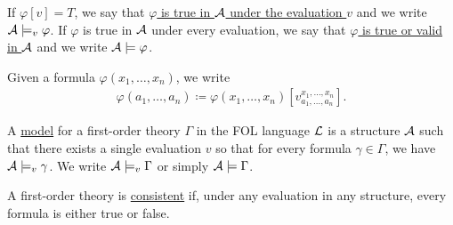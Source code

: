 \begin{definition}
  If $\varphi[v] = T$, we say that \ul{$\varphi$ is true in $\mathcal A$ under the evaluation $v$} and we write $\mathcal A \models_v \varphi$. If $\varphi$ is true in $\mathcal A$ under every evaluation, we say that \ul{$\varphi$ is true or valid in $\mathcal A$} and we write $\mathcal A \models \varphi$.

  Given a formula $\varphi(x_1, \ldots, x_n)$, we write
  \begin{align*}
    \varphi(a_1, \ldots, a_n) \coloneqq \varphi(x_1, \ldots, x_n)[v_{a_1, \ldots, a_n}^{x_1, \ldots, x_n}].
  \end{align*}
\end{definition}

\begin{definition}\label{def:first_order_model}\cite[definition 4.4]{Nerode2012}
  A \ul{model} for a first-order theory $\Gamma$ in the FOL language $\mathcal L$ is a structure $\mathcal A$ such that there exists a single evaluation $v$ so that for every formula $\gamma \in \Gamma$, we have $\mathcal A \models_v \gamma$. We write $\mathcal A \models_v \Gamma$ or simply $\mathcal A \models \Gamma$.
\end{definition}

\begin{definition}\label{def:first_order_consistent}
  A first-order theory is \ul{consistent} if, under any evaluation in any structure, every formula is either true or false.
\end{definition}

